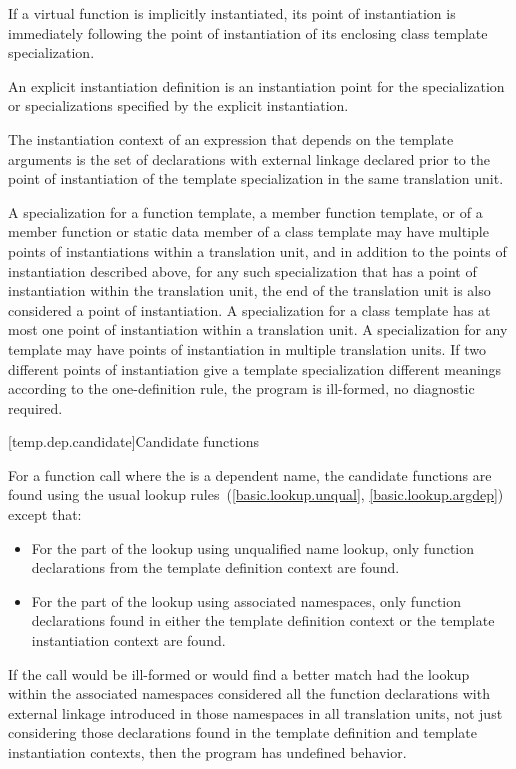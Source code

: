 \pnum
If a virtual function is implicitly instantiated, its point of instantiation
is immediately following the point of instantiation of its enclosing class
template specialization.

\pnum
An explicit instantiation definition is an instantiation
point for the specialization or specializations specified by the explicit
instantiation.

\pnum
The instantiation context of an expression that depends on the template
arguments is the set of declarations with external linkage declared prior to the
point of instantiation of the template specialization in the same translation
unit.

\pnum
A specialization for a function template, a member function template,
or of a member function or static data member of a class template may have
multiple points of instantiations within a translation unit, and in addition
to the points of instantiation described above, for any such specialization
that has a point of instantiation within the translation unit, the end of the
translation unit is also considered a point of instantiation.
A specialization for a class template has at most one point of instantiation
within a translation unit.
A specialization for any template may have points of instantiation in multiple
translation units.
If two different points of instantiation give a template specialization
different meanings according to the one-definition rule,
the program is ill-formed, no diagnostic required.

[temp.dep.candidate]{Candidate functions}

\pnum
{}%
For a function call where the  is a
dependent name,
the candidate functions are found using the usual lookup
rules~(\ref{basic.lookup.unqual}, \ref{basic.lookup.argdep}) except that:

\begin{itemize}
\item
For the part of the lookup using unqualified name lookup,
only function declarations
from the template definition context are found.
\item
For the part of the lookup using associated namespaces,
only function declarations found in either the template
definition context or the template instantiation context are found.
\end{itemize}

If
the call would be ill-formed or would find a better match had the lookup
within the associated namespaces considered all the function declarations with
external linkage introduced in those namespaces in all translation units,
not just considering those declarations found in the template definition and
template instantiation contexts, then the program has undefined behavior.

